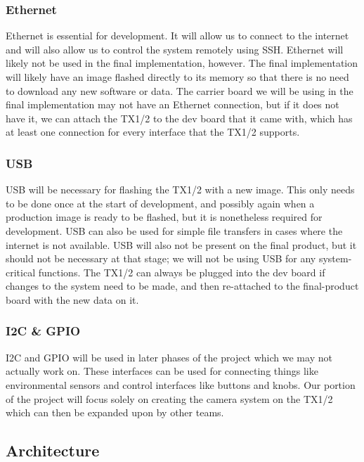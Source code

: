 \documentclass[letterpaper,10pt,serif,draftclsnofoot,onecolumn,compsoc,titlepage]{IEEEtran}
\begin{document}
\subsubsection{Ethernet}

Ethernet is essential for development. It will allow us to connect to the internet and 
will also allow us to control the system remotely using SSH. Ethernet will likely not 
be used in the final implementation, however. The final implementation will likely 
have an image flashed directly to its memory so that there is no need to download any 
new software or data. The carrier board we will be using in the final implementation 
may not have an Ethernet connection, but if it does not have it, we can attach the TX1/2 
to the dev board that it came with, which has at least one connection for every 
interface that the TX1/2 supports. \\

\subsubsection{USB}

USB will be necessary for flashing the TX1/2 with a new image. This only needs to be 
done once at the start of development, and possibly again when a production image is 
ready to be flashed, but it is nonetheless required for development. USB can also be 
used for simple file transfers in cases where the internet is not available. USB will 
also not be present on the final product, but it should not be necessary at that stage; 
we will not be using USB for any system-critical functions. The TX1/2 can always be 
plugged into the dev board if changes to the system need to be made, and then 
re-attached to the final-product board with the new data on it.\\

\subsubsection{I2C \& GPIO}

I2C and GPIO will be used in later phases of the project which we may not actually 
work on. These interfaces can be used for connecting things like environmental sensors 
and control interfaces like buttons and knobs. Our portion of the project will focus 
solely on creating the camera system on the TX1/2 which can then be expanded upon by 
other teams. \\

\subsection{Architecture}
\end{document}
